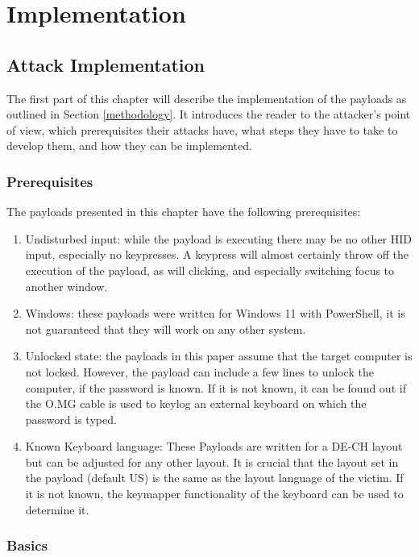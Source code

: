 \chapter{Implementation} \label{Implementation}

\section{Attack Implementation} \label{Attack Implementation}

The first part of this chapter will describe the implementation of the payloads as outlined in Section \ref{methodology}. It introduces the reader to the attacker's point of view, which prerequisites their attacks have, what steps they have to take to develop them, and how they can be implemented. 


\subsection{Prerequisites}

The payloads presented in this chapter have the following prerequisites:
\begin{enumerate}
    \item Undisturbed input: while the payload is executing there may be no other HID input, especially no keypresses. A keypress will almost certainly throw off the execution of the payload, as will clicking, and especially switching focus to another window.
    \item Windows: these payloads were written for Windows 11 with PowerShell, it is not guaranteed that they will work on any other system.
    \item Unlocked state: the payloads in this paper assume that the target computer is not locked. However, the payload can include a few lines to unlock the computer, if the password is known. If it is not known, it can be found out if the O.MG cable is used to keylog an external keyboard on which the password is typed. 
    \item Known Keyboard language: These Payloads are written for a DE-CH layout but can be adjusted for any other layout. It is crucial that the layout set in the payload (default US) is the same as the layout language of the victim. If it is not known, the keymapper functionality of the keyboard can be used to determine it. 
\end{enumerate}

\subsection{Basics}

